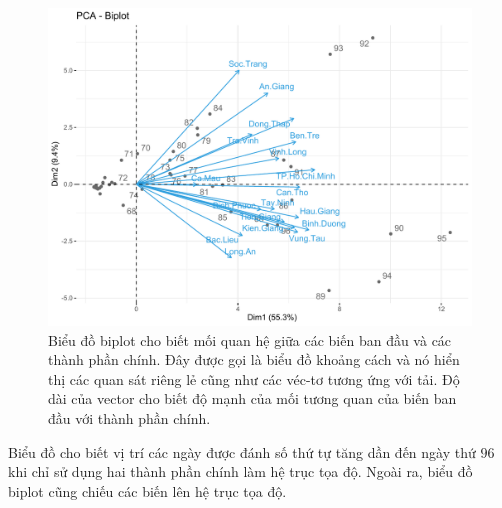 \documentclass[../thesis.tex]{subfiles}
\begin{document}
\begin{figure}[H]
	\centering
	\includegraphics[width=0.7\linewidth]{images/biplot_case}
	\caption[Biểu đồ biplot cho dữ liệu hằng ngày]{Biểu đồ biplot cho biết mối quan hệ giữa các biến ban đầu và các thành phần chính. Đây được gọi là biểu đồ khoảng cách và nó hiển thị các quan sát riêng lẻ cũng như các véc-tơ tương ứng với tải. Độ dài của vector cho biết độ mạnh của mối tương quan của biến ban đầu với thành phần chính.}
	\label{fig:biplotcase}
\end{figure}

Biểu đồ cho biết vị trí các ngày được đánh số thứ tự tăng dần đến ngày thứ $ 96 $ khi chỉ sử dụng hai thành phần chính làm hệ trục tọa độ. Ngoài ra, biểu đồ biplot cũng chiếu các biến lên hệ trục tọa độ. 

\begin{Shaded}
	\begin{Highlighting}[]
\SpecialCharTok{\%\textgreater{}\%} 
		 \NormalTok{,}
		 \NormalTok{,}
		 \NormalTok{(}\NormalTok{, }\NormalTok{, }\NormalTok{),}
		 \NormalTok{) }
	\end{Highlighting}
\end{Shaded}
\end{document}
